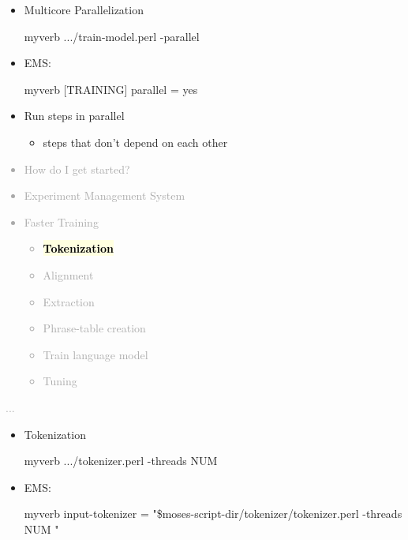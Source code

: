 \documentclass[landscape]{uedslides2C}
\newcommand{\currenttopic}[1]{\colorbox{lightyellow}{\textcolor{black}{\bf #1}}}
\begin{document}
\begin{itemize} \itemsep -1mm

\item {Multicore Parallelization} 
\begin{SaveVerbatim}{myverb} 
  .../train-model.perl -parallel
\end{SaveVerbatim}
\colorbox{gray}{}

\item EMS: 
\begin{SaveVerbatim}{myverb} 
  [TRAINING]
  parallel = yes
\end{SaveVerbatim}
\colorbox{gray}{}

\item Run steps in parallel
	\begin{itemize}
	\item steps that don't depend on each other
	\end{itemize}

\end{itemize}


\vspace{-5mm}
\textcolor{darkgrey}{
\begin{itemize} \itemsep -1mm
\item {How do I get started?}
\item {Experiment Management System}
\item {Faster Training}
  \begin{itemize}
  \item \currenttopic{Tokenization}
  \item Alignment
  \item Extraction
  \item Phrase-table creation
  \item Train language model
  \item Tuning
  \end{itemize}
\end{itemize}
...
}



\begin{itemize} \itemsep -1mm

\item {Tokenization}
\begin{SaveVerbatim}{myverb} 
  .../tokenizer.perl -threads NUM
\end{SaveVerbatim}
\colorbox{gray}{}

\item EMS: 
\begin{SaveVerbatim}{myverb} 
  input-tokenizer  = "\$moses-script-dir/tokenizer/tokenizer.perl 
		    -threads NUM " 
\end{SaveVerbatim}
\colorbox{gray}{}
  
  
\end{itemize}
\end{document}

